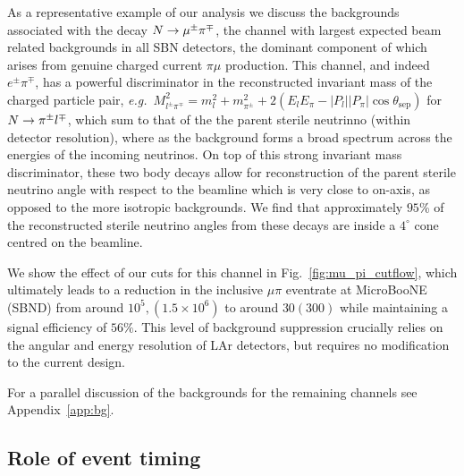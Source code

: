 \documentclass[11pt, a4paper]{article}
\newcommand{\reffig}[1]{Fig.~\ref{#1}}
\newcommand{\refapp}[1]{Appendix~\ref{#1}}
\def\eg{\emph{e.g.}}
\def\ster{\ensuremath N}
\begin{document}
As a representative example of our analysis we discuss the backgrounds
associated with the decay $\ster \rightarrow \mu^\pm \pi^\mp$, the channel with
largest expected beam related backgrounds in all SBN detectors, the dominant
component of which arises from genuine charged current $\pi \mu$ production.
This channel, and indeed $e^\pm \pi^\mp$, has a powerful discriminator in the
reconstructed invariant mass of the charged particle pair, \eg\  $M_{l^\pm
\pi^\mp}^2=m_l^2+m_{\pi^\pm}^2+ 2(E_l E_\pi - |P_l||P_\pi|\cos\theta_\text{sep})$
for $\ster\rightarrow \pi^\pm l^\mp$, which sum to that of the the parent
sterile neutrinno (within detector resolution), where as the background forms
a broad spectrum across the energies of the incoming neutrinos. On top of this strong invariant mass discriminator, these two body decays allow for reconstruction of the 
parent sterile neutrino angle with respect to the beamline which is very
close to on-axis, as opposed to the more isotropic backgrounds. We find that
approximately $95$\% of the reconstructed sterile neutrino angles from these
decays are inside a $4^\circ$ cone centred on the beamline. 

We show the effect of our cuts for this channel in \reffig{fig:mu_pi_cutflow},
which ultimately leads to a reduction in the inclusive $\mu \pi$ eventrate at
MicroBooNE (SBND) from around $10^5, (1.5\times10^6)$ to around $30 (300)$
while maintaining a signal efficiency of $56\%$. This level of background
suppression crucially relies on the angular and energy resolution of LAr
detectors, but requires no modification to the current design. 

For a parallel discussion of the backgrounds for the remaining channels see
\refapp{app:bg}.

\subsection{\label{sec:timing}Role of event timing}
\end{document}
